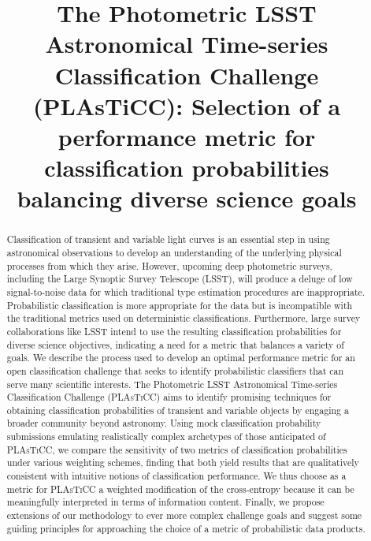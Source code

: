 \documentclass[\docopts]{\docclass}
\begin{document}

\title{The Photometric LSST Astronomical Time-series Classification Challenge (PLA\MakeLowercase{s}T\MakeLowercase{i}CC): Selection of a performance metric for classification probabilities \\ balancing diverse science goals}

\maketitlepre


\begin{abstract}

  \vspace{0.5cm}

  Classification of transient and variable light curves is an essential step in using astronomical observations to develop an understanding of the underlying physical processes from which they arise.
  However, upcoming deep photometric surveys, including the Large Synoptic Survey Telescope (\textsc{LSST}), will produce a deluge of low signal-to-noise data for which traditional type estimation procedures are inappropriate.
  Probabilistic classification is more appropriate for the data but is incompatible with the traditional metrics used on deterministic classifications.
  Furthermore, large survey collaborations like \textsc{LSST} intend to use the resulting classification probabilities for diverse science objectives, indicating a need for a metric that balances a variety of goals.
  We describe the process used to develop an optimal performance metric for an open classification challenge that seeks to identify probabilistic classifiers that can serve many scientific interests.
  The Photometric \textsc{LSST} Astronomical Time-series Classification Challenge (\textsc{PLAsTiCC}) aims to identify promising techniques for obtaining classification probabilities of transient and variable objects by engaging a broader community beyond astronomy.
  Using mock classification probability submissions emulating realistically complex archetypes of those anticipated of \textsc{PLAsTiCC}, we compare the sensitivity of two metrics of classification probabilities under various weighting schemes, finding that both yield results that are qualitatively consistent with intuitive notions of classification performance.
  We thus choose as a metric for \textsc{PLAsTiCC} a weighted modification of the cross-entropy because it can be meaningfully interpreted in terms of information content.
  Finally, we propose extensions of our methodology to ever more complex challenge goals and suggest some guiding principles for approaching the choice of a metric of probabilistic data products.

  \vspace{1cm}

\end{abstract}
\end{document}
